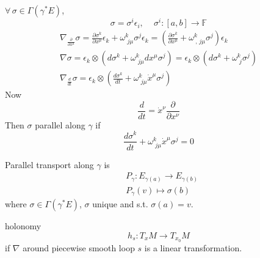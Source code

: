 $\forall \, \sigma \in \Gamma(\gamma^*E)$,  
\[
\sigma  = \sigma^i \epsilon_i, \quad \, \sigma^i: [a,b] \to \mathbb{F}
\]
\[
\begin{gathered}
	\nabla_{ \frac{ \partial }{ \partial x^{\mu} } } \sigma = \frac{ \partial \sigma^k}{ \partial x^{\mu}  } \epsilon_k + \omega^k_{ \, \, j \mu } \sigma^j \epsilon_k = \left( \frac{ \partial \sigma ^k }{ \partial x^{\mu } } + \omega^k_{ \ , \, j \mu} \sigma^j  \right)  \epsilon_k \\ 
 \nabla \sigma = \epsilon_k \otimes ( d\sigma^k + \omega^k_{ \, \, j \mu} dx^{\mu} \sigma^j ) = \epsilon_k \otimes (d\sigma^k + \omega^k_{ \, \, j} \sigma^j  )  \\
 \nabla_{ \frac{d}{dt} } \sigma = \epsilon_k \otimes \left( \frac{d\sigma^k }{ dt } + \omega^k_{ \, \, j \mu } \dot{x}^{\mu} \sigma^j  \right)
\end{gathered}
\]
Now
\[
\frac{d}{dt} = \dot{x}^{\nu} \frac{ \partial }{ \partial x^{\nu } }
\]
Then $\sigma$ parallel along $\gamma$ if 
\[
\frac{ d\sigma^k}{ dt} + \omega^k_{ \, \, j\mu} \dot{x}^{\mu} \sigma^j = 0 
\]
\begin{definition}  Parallel transport along $\gamma$ is 
\begin{equation}
\begin{aligned}
	& P_{\gamma} : E_{\gamma(a)} \to E_{\gamma(b)} \\ 
	& P_{\gamma}(v) \mapsto \sigma(b)
\end{aligned}
\end{equation}
where $\sigma \in \Gamma(\gamma^*E)$, $\sigma$ unique and s.t. $\sigma(a)=v$.  
\end{definition}







\begin{lemma}
	holonomy 
	\[
	h_s:T_xM \to T_{x_0}M
	\]
	if $\nabla$ around piecewise smooth loop $s$ is a linear transformation.  
\end{lemma}






